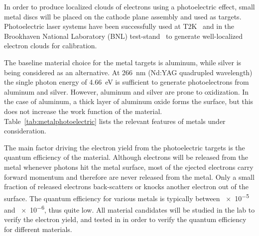 In order to produce localized clouds of electrons using a photoelectric effect, small metal discs will be placed on the cathode plane assembly and used as targets. Photoelectric laser systems have been successfully used at T2K~\cite{Abgrall:2010hi} and in the Brookhaven National Laboratory (BNL)  test-stand~\cite{Li:2016ods} to generate well-localized electron clouds for \efield calibration. 


The baseline material choice for the metal targets is aluminum, while silver is being considered as an alternative. At \SI{266}{\nano\m} (Nd:YAG quadrupled wavelength) the single photon energy of \SI{4.66}{\eV} is sufficient to generate photoelectrons from aluminum and silver. However, aluminum and silver are prone to oxidization.
In the case of aluminum, a thick layer of aluminum oxide forms the surface, but this does not increase the work function of the material. Table~\ref{tab:metalphotoelectric} lists the relevant features of metals under consideration.  

The main factor driving the electron yield from the photoelectric targets is the quantum efficiency of the material. Although electrons will be released from the metal whenever photons hit the metal surface, most of the ejected electrons carry forward momentum and therefore are never released from the metal. Only a small fraction of released electrons back-scatters or knocks another electron out of the surface. The quantum efficiency for various metals is typically between \num{e-5}  and \num{e-6}, thus quite low.  All material candidates will be studied in the lab to verify the electron yield, and tested in  in order to verify the quantum efficiency for different materials.

